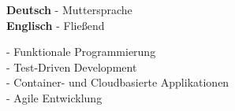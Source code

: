 \documentclass[9pt]{../developercv} %
\begin{document}
\begin{minipage}[t]{0.45\textwidth}
	\vspace{-\baselineskip} %

	
	\textbf{Deutsch} - Muttersprache\\
	\textbf{Englisch} - Fließend
\end{minipage}
\hfill
\begin{minipage}[t]{0.45\textwidth}
	\vspace{-\baselineskip} %
	
	
        - Funktionale Programmierung\\
        - Test-Driven Development\\
        - Container- und Cloudbasierte Applikationen\\
        - Agile Entwicklung\\
\end{minipage}

\end{document}
